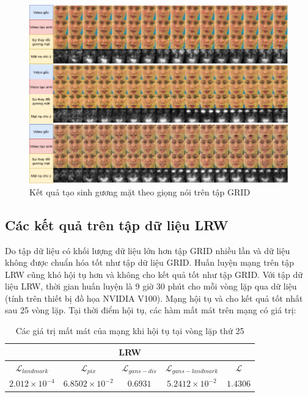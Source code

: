 \begin{figure}[H]
    \centering
    \includegraphics[width=15cm]{./content/materials/grid_examples-face.png}
    \caption{Kết quả tạo sinh gương mặt theo giọng nói trên tập GRID}
\end{figure}

\subsection{Các kết quả trên tập dữ liệu LRW}

Do tập dữ liệu có khối lượng dữ liệu lớn hơn tập GRID nhiều lần và dữ liệu không được chuẩn hóa tốt như tập dữ liệu GRID. Huấn luyện mạng trên tập LRW cũng khó hội tụ hơn và không cho kết quả tốt như tập GRID. Với tập dữ liệu LRW, thời gian huấn luyện là 9 giờ 30 phút cho mỗi vòng lặp qua dữ liệu (tính trên thiết bị đồ họa NVIDIA V100). Mạng hội tụ và cho kết quả tốt nhất sau 25 vòng lặp. Tại thời điểm hội tụ, các hàm mất mát trên mạng có giá trị:

\begin{table}[h]
    \centering
    \begin{tabular}{c | c | c | c | c}
    \hline 
    \multicolumn{5}{c}{LRW}\\
    \hline 
    \textbf{$\mathcal{L}_{landmark}$} & \textbf{$\mathcal{L}_{pix}$} & \textbf{$\mathcal{L}_{gans-dis}$} & \textbf{$\mathcal{L}_{gans-landmark}$} & \textbf{$\mathcal{L}$}\\
    \hline
    $2.012 \times 10^{-4}$ & $6.8502 \times 10^{-2}$ & $0.6931$ & $5.2412 \times 10^{-2}$ & $1.4306$\\
    \hline
    \end{tabular}
    \caption{Các giá trị mất mát của mạng khi hội tụ tại vòng lặp thứ 25}
    \label{table:lrw_loss}
\end{table}

